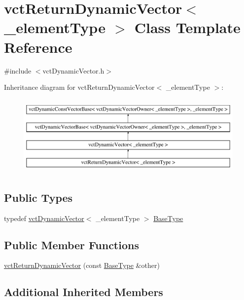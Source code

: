 \hypertarget{classvct_return_dynamic_vector}{}\section{vct\+Return\+Dynamic\+Vector$<$ \+\_\+element\+Type $>$ Class Template Reference}
\label{classvct_return_dynamic_vector}


{\ttfamily \#include $<$vct\+Dynamic\+Vector.\+h$>$}

Inheritance diagram for vct\+Return\+Dynamic\+Vector$<$ \+\_\+element\+Type $>$\+:\begin{figure}[H]
\begin{center}
\leavevmode
\includegraphics[height=4.000000cm]{d9/dcb/classvct_return_dynamic_vector}
\end{center}
\end{figure}
\subsection*{Public Types}
\begin{DoxyCompactItemize}
\item 
typedef \hyperlink{classvct_dynamic_vector}{vct\+Dynamic\+Vector}$<$ \+\_\+element\+Type $>$ \hyperlink{classvct_return_dynamic_vector_aec5f994308da32f15af397a1f89ca23d}{Base\+Type}
\end{DoxyCompactItemize}
\subsection*{Public Member Functions}
\begin{DoxyCompactItemize}
\item 
\hyperlink{classvct_return_dynamic_vector_a5df1d2e9fe43ee64b25125657618b8bd}{vct\+Return\+Dynamic\+Vector} (const \hyperlink{classvct_dynamic_vector_aab0ea4a1ec16f7694beb39869ab780bf}{Base\+Type} \&other)
\end{DoxyCompactItemize}
\subsection*{Additional Inherited Members}


